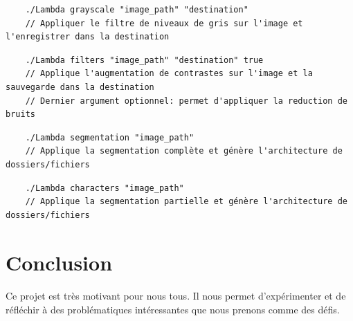 \documentclass{article}
\begin{document}
\vspace*{0.5cm}

\begin{lstlisting}
	./Lambda grayscale "image_path" "destination"
	// Appliquer le filtre de niveaux de gris sur l'image et l'enregistrer dans la destination
\end{lstlisting}


\begin{lstlisting}
	./Lambda filters "image_path" "destination" true 
	// Applique l'augmentation de contrastes sur l'image et la sauvegarde dans la destination
	// Dernier argument optionnel: permet d'appliquer la reduction de bruits
\end{lstlisting}

\begin{lstlisting}
	./Lambda segmentation "image_path"
	// Applique la segmentation complète et génère l'architecture de dossiers/fichiers
\end{lstlisting}

\begin{lstlisting}
	./Lambda characters "image_path"
	// Applique la segmentation partielle et génère l'architecture de dossiers/fichiers
\end{lstlisting}

\newpage
{}
\section{Conclusion}

\paragraph{}Ce projet est très motivant pour nous tous. Il nous permet d'expérimenter et de réfléchir à des problématiques intéressantes que nous prenons comme des défis. 


\newpage
\end{document}
